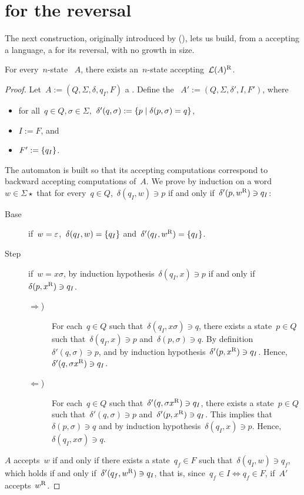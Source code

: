 \section{\texorpdfstring{\ONFA}{1NFA} for the reversal}\label{sub:reversal}
The next construction, originally introduced by \citeauthor{RabSco59} (\cite{RabSco59}), lets us build, from a \ONFA accepting a language, a \ONFA for its reversal, with no growth in size.
\begin{thrm}
	For every~$n$-state \ONFA~$A$, there exists an~$n$-state \ONFA accepting~$\mathcal L(A)^{\mathrm R}$.
\end{thrm}
\begin{proof}
	Let~$A:=(Q,\Sigma,\delta,q_I,F)$ a \ONFA.
	Define the \ONFA~$A':=(Q,\Sigma,\delta',I,F')$, where
	\begin{itemize}
		\item for all~$q\in Q,\sigma\in\Sigma$,~$\delta'(q,\sigma):=\{p \mid \delta(p,\sigma)=q\}$,
		\item $I:=F$, and
		\item $F':=\{q_I\}$.
	\end{itemize}
	The automaton is built so that its accepting computations correspond to backward accepting computations of~$A$.
	We prove by induction on a word~$w\in\Sigma\star$ that for every~$q\in Q$,~$\delta(q_I,w)\ni p$ if and only if~$\delta'(p,w^{\mathrm R})\ni q_I$:
	\begin{description}
		\item[Base] if~$w=\varepsilon$,~$\delta(q_I,w)=\{q_I\}$ and~$\delta'(q_I,w^{\mathrm R})=\{q_I\}$.
		\item[Step] if~$w=x\sigma$, by induction hypothesis~$\delta(q_I,x)\ni p$ if and only if~$\delta(p,x^{\mathrm R})\ni q_I$.
		      \begin{description}
			      \item[$\Rightarrow$)] For each~$q\in Q$ such that~$\delta(q_I,x\sigma)\ni q$, there exists a state~$p\in Q$ such that~$\delta(q_I,x)\ni p$ and~$\delta(p,\sigma)\ni q$.
			            By definition~$\delta'(q,\sigma)\ni p$, and by induction hypothesis~$\delta'(p,x^{\mathrm R})\ni q_I$. Hence,~$\delta'(q,\sigma x^{\mathrm R})\ni q_I$.
			      \item[$\Leftarrow$)] For each~$q\in Q$ such that~$\delta'(q,\sigma x^{\mathrm R})\ni q_I$, there exists a state~$p\in Q$ such that~$\delta'(q,\sigma)\ni p$ and~$\delta'(p,x^{\mathrm R})\ni q_I$.
			            This implies that $\delta(p,\sigma)\ni q$ and by induction hypothesis~$\delta(q_I,x)\ni p$. Hence, $\delta(q_I,x\sigma)\ni q$.
		      \end{description}
	\end{description}
	$A$ accepts~$w$ if and only if there exists a state~$q_f\in F$ such that~$\delta(q_I,w)\ni q_f$, which holds if and only if~$\delta'(q_f,w^{\mathrm R})\ni q_I$, that is, since~$q_f\in I\iff q_f\in F$, if~$A'$ accepts~$w^{\mathrm R}$.
\end{proof}
